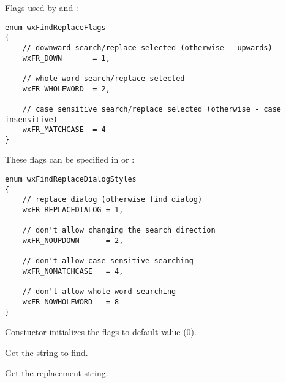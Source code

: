 Flags used by 
 and
:

\begin{verbatim}
enum wxFindReplaceFlags
{
    // downward search/replace selected (otherwise - upwards)
    wxFR_DOWN       = 1,

    // whole word search/replace selected
    wxFR_WHOLEWORD  = 2,

    // case sensitive search/replace selected (otherwise - case insensitive)
    wxFR_MATCHCASE  = 4
}
\end{verbatim}

These flags can be specified in 
 or 
:

\begin{verbatim}
enum wxFindReplaceDialogStyles
{
    // replace dialog (otherwise find dialog)
    wxFR_REPLACEDIALOG = 1,

    // don't allow changing the search direction
    wxFR_NOUPDOWN      = 2,

    // don't allow case sensitive searching
    wxFR_NOMATCHCASE   = 4,

    // don't allow whole word searching
    wxFR_NOWHOLEWORD   = 8
}
\end{verbatim}


\label{wxfindreplacedatactor}


Constuctor initializes the flags to default value ($0$).

\label{wxfindreplacedatagetfindstring}


Get the string to find.

\label{wxfindreplacedatagetreplacestring}


Get the replacement string.

\label{wxfindreplacedatagetflags}


